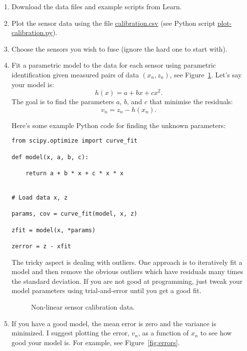 \documentclass[a4paper, 12pt]{article}
\newcommand{\reffig}[1]{\mbox{Figure~\ref{fig:#1}}}
\begin{document}
\begin{enumerate}
\item Download the data files and example scripts from Learn.

\item Plot the sensor data using the file \url{calibration.csv} (see
  Python script \url{plot-calibration.py}).

\item Choose the sensors you wish to fuse (ignore the hard one to
  start with).


\item Fit a parametric model to the data for each sensor using
  parametric identification given measured pairs of data $(x_n, z_n)$,
  see \reffig{fit}.  Let's say your model is:
  \begin{equation}
    h(x) = a + b x + c x^2.
  \end{equation}
  The goal is to find the parameters $a$, $b$, and $c$ that minimise
  the residuals:
    \begin{equation}
    v_n = z_n - h(x_n).
    \end{equation}

    Here's some example Python code for finding the unknown parameters:
%
\begin{verbatim}
from scipy.optimize import curve_fit

def model(x, a, b, c):

    return a + b * x + c * x * x


# Load data x, z

params, cov = curve_fit(model, x, z)

zfit = model(x, *params)

zerror = z - xfit
\end{verbatim}

  The tricky aspect is dealing with outliers.  One approach is to
  iteratively fit a model and then remove the obvious outliers which
  have residuals many times the standard deviation.  If you are not
  good at programming, just tweak your model parameters using
  trial-and-error until you get a good fit.

  \begin{figure}[!h]
  \centering
  
  \caption{Non-linear sensor calibration data.}
  \label{fig:fit}
  \end{figure}


  \item If you have a good model, the mean error is zero and the
    variance is minimized.  I suggest plotting the error, $v_n$, as a
    function of $x_n$ to see how good your model is.  For example, see
    \reffig{errors}.


\end{enumerate}
\end{document}
